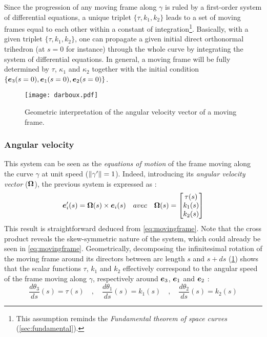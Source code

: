 Since the progression of any moving frame along $\gamma$ is ruled by a first-order system of differential equations, a unique triplet $\{\tau, k_{1}, k_{2}\}$ leads to a set of moving frames equal to each other within a constant of integration\footnote{
This assumption reminds the \emph{Fundamental theorem of space curves} (\cref{sec:fundamental}).
}. Basically, with a given triplet $\{\tau, k_{1}, k_{2}\}$, one can propagate a given initial direct orthonormal trihedron (at $s=0$ for instance) through the whole curve by integrating the system of differential equations. In general, a moving frame will be fully determined by $\tau$, $\kappa_{1}$ and $\kappa_{2}$ together with the initial condition $\{\boldsymbol{e}_{3}(s=0),\boldsymbol{e}_{1}(s=0),\boldsymbol{e}_{2}(s=0)\}$.

\begin{figure}[t]
\centering
\texttt{[image: darboux.pdf]}
\caption{Geometric interpretation of the angular velocity vector of a moving frame.}
\label{fig:3_4}
\end{figure}

\subsubsection{Angular velocity}
This system can be seen as the \emph{equations of motion} of the frame moving along the curve $\gamma$ at unit speed ($\lVert\gamma'\rVert=1$). Indeed, introducing its \emph{angular velocity vector} ($\boldsymbol{\Omega}$), the previous system is expressed as :
\begin{equation}
	\boldsymbol{e}'_{i}(s) = \boldsymbol{\Omega}(s) \times \boldsymbol{e}_{i}(s)
	\quad avec \quad
	\boldsymbol{\Omega}(s)
	=
	\begin{bmatrix}
		\tau(s) \\
		k_1(s) \\
		k_2(s)
	\end{bmatrix}
\end{equation}
This result is straightforward deduced from \cref{eq:movingframe}. Note that the cross product reveals the skew-symmetric nature of the system, which could already be seen in \cref{eq:movingframe}.
Geometrically, decomposing the infinitesimal rotation of the moving frame around its directors between arc length $s$ and $s+ds$ (\cref{fig:3_4}) shows that the scalar functions $\tau$, $k_{1}$ and $k_{2}$ effectively correspond to the angular speed of the frame moving along $\gamma$, respectively around $\boldsymbol{e}_{3}$, $\boldsymbol{e}_{1}$ and $\boldsymbol{e}_{2}$ :
\begin{equation}
	\frac{d\theta_3}{ds}(s) = \tau(s)
	\quad,\quad
	\frac{d\theta_1}{ds}(s) = k_{1}(s)
	\quad,\quad
	\frac{d\theta_2}{ds}(s) = k_{2}(s)
\end{equation}

